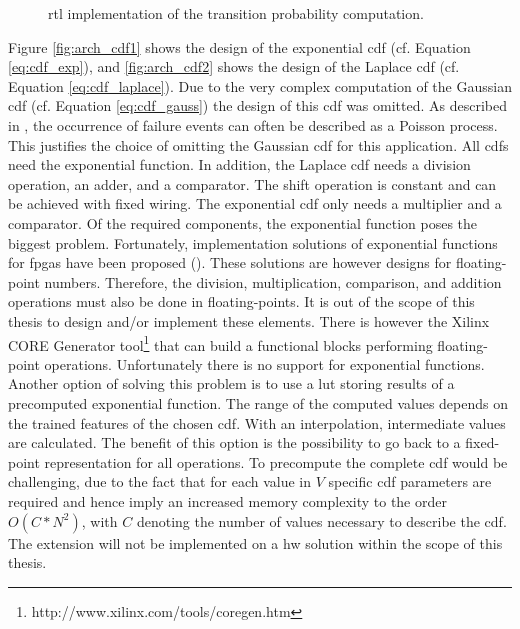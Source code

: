 \documentclass[mscthesis]{usiinfthesis}
\begin{document}
\begin{figure}
    \centering
    
    \caption{\acrshort{rtl} implementation of the transition probability
        computation.}
    \label{fig:arch_ext}
\end{figure}

Figure \ref{fig:arch_cdf1} shows the design of the exponential \gls{cdf} (cf.
Equation \ref{eq:cdf_exp}), and \ref{fig:arch_cdf2} shows the design of the
Laplace \gls{cdf} (cf. Equation \ref{eq:cdf_laplace}). Due to the very complex
computation of the Gaussian \gls{cdf} (cf. Equation \ref{eq:cdf_gauss}) the
design of this \gls{cdf} was omitted. As described in \cite{ross10}, the
occurrence of failure events can often be described as a Poisson process. This
justifies the choice of omitting the Gaussian \gls{cdf} for this application.
All \glspl{cdf} need the exponential function. In addition, the Laplace
\gls{cdf} needs a division operation, an adder, and a comparator. The shift
operation is constant and can be achieved with fixed wiring. The exponential
\gls{cdf} only needs a multiplier and a comparator. Of the required components,
the exponential function poses the biggest problem. Fortunately, implementation
solutions of exponential functions for \glspl{fpga} have been proposed
(\cite{RSSI08_Pottathuparambil, ICFPT05_Detrey}). These solutions are however
designs for floating-point numbers. Therefore, the division, multiplication,
comparison, and addition operations must also be done in floating-points. It is
out of the scope of this thesis to design and/or implement these elements.
There is however the Xilinx CORE Generator
tool\footnote{http://www.xilinx.com/tools/coregen.htm} that can build
a functional blocks performing floating-point operations.  Unfortunately there
is no support for exponential functions. Another option of solving this problem
is to use a \gls{lut} storing results of a precomputed exponential function.
The range of the computed values depends on the trained features of the chosen
\gls{cdf}. With an interpolation, intermediate values are calculated. The
benefit of this option is the possibility to go back to a fixed-point
representation for all operations. To precompute the complete \gls{cdf} would
be challenging, due to the fact that for each value in $V$ specific \gls{cdf}
parameters are required and hence imply an increased memory complexity to the
order $O(C*N^2)$, with $C$ denoting the number of values necessary to describe
the \gls{cdf}. The extension will not be implemented on a \gls{hw} solution
within the scope of this thesis.
\end{document}
